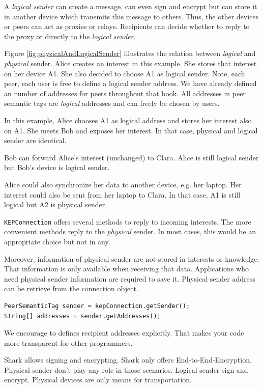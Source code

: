 A {\it logical sender} can create a message, can even sign and encrypt but can store it in another device which transmits this message to others. Thus, the other devices or peers can act as proxies or relays. Recipients can decide whether to reply to the proxy or directly to the {\it logical sender}. 

Figure \ref{fig:physicalAndLogicalSender} illustrates the relation between {\it logical} and {\it physical} sender. Alice creates an interest in this example. She stores that interest on her device A1. She also decided to choose A1 as logical sender. Note, each peer, each user is free to define a logical sender address. We have already defined an number of addresses for peers throughout that book. All addresses in peer semantic tags are {\it logical} addresses and can freely be chosen by users.

In this example, Alice chooses A1 as logical address and stores her interest also on A1. She meets Bob and exposes her interest. In that case, physical and logical sender are identical.

Bob can forward Alice's interest (unchanged) to Clara. Alice is still logical sender but Bob's device is logical sender. 

Alice could also synchronize her data to another device, e.g. her laptop. Her interest could also be sent from her laptop to Clara. In that case, A1 is still logical but A2 is physical sender.

{\tt KEPConnection} offers several methods to reply to incoming interests. The more convenient methods reply to the {\it physical} sender. In most cases, this would be an appropriate choice but not in any. 

Moreover, information of physical sender are not stored in interests or knowledge. That information is only available when receiving that data.
Applications who need physical sender information are required to save it.
Physical sender address can be retrieve from the connection object.

\begin{verbatim}
PeerSemanticTag sender = kepConnection.getSender();
String[] addresses = sender.getAddresses();
\end{verbatim}

We encourage to defines recipient addresses explicitly. That makes your code more transparent for other programmers.

Shark allows signing and encrypting. Shark only offers End-to-End-Encryption. Physical sender don't play any role in those scenarios. Logical sender sign and encrypt. Physical devices are only means for transportation.

